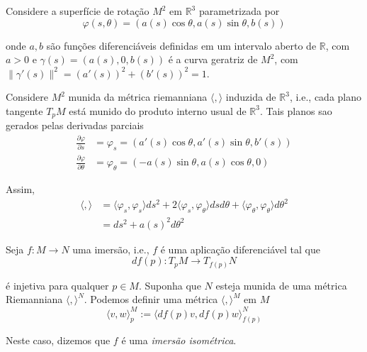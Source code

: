 \begin{exemplo}
	Considere a superfície de rotação $M^2$ em $\mathbb{R}^3$ parametrizada por
	\begin{equation*}
		\varphi(s,\theta) = (a(s) \cos \theta, a(s) \sin \theta, b(s))
	\end{equation*}
	
	onde $a,b$ são funções diferenciáveis definidas em um intervalo aberto de $\mathbb{R}$, com $a>0$ e $\gamma(s) = (a(s),0,b(s))$ é a curva geratriz de $M^2$, com $\| \gamma'(s) \|^2 = (a'(s))^2 + (b'(s))^2 = 1$.
	
	Considere $M^2$ munida da métrica riemanniana $\langle , \rangle$ induzida de $\mathbb{R}^3$, i.e., cada plano tangente $T_p M$ está munido do produto interno usual de $\mathbb{R}^3$. Tais planos sao gerados pelas derivadas parciais
	\begin{align*}
		\frac{\partial \varphi}{\partial s} &= \varphi_s = (a'(s) \cos \theta, a'(s) \sin \theta, b'(s))\\
		\frac{\partial \varphi}{\partial \theta} &= \varphi_{\theta} = (-a(s) \sin \theta, a(s) \cos \theta, 0)
	\end{align*}
	
	Assim,
	\begin{align*}
		\langle , \rangle &= \langle \varphi_s, \varphi_s \rangle ds^2 + 2 \langle \varphi_s, \varphi_{\theta} \rangle ds d\theta + \langle \varphi_{\theta}, \varphi_{\theta} \rangle d\theta^2\\
		&= ds^2 + a(s)^2 d\theta^2
	\end{align*}
\end{exemplo}

\begin{exemplo}
	Seja $f: M \rightarrow N$ uma imersão, i.e., $f$ é uma aplicação diferenciável tal que
	\begin{equation*}
		df(p): T_p M \rightarrow T_{f(p)} N
	\end{equation*}
	
	é injetiva para qualquer $p \in M$. Suponha que $N$ esteja munida de uma métrica Riemanniana $\langle , \rangle^N$. Podemos definir uma métrica $\langle , \rangle^M$ em $M$
	\begin{equation*}
		\langle v,w \rangle_p^M := \langle df(p) v, df(p) w \rangle_{f(p)}^N
	\end{equation*}
	
	Neste caso, dizemos que $f$ é uma \emph{imersão isométrica}.
\end{exemplo}

